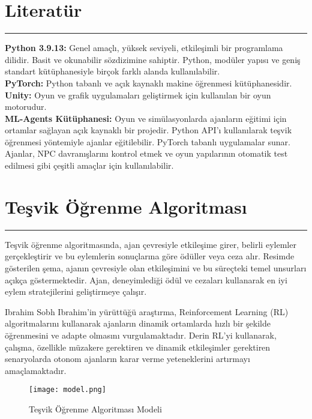 \documentclass{article}
\begin{document}
\section{Literatür}
\rule{\textwidth}{0.5pt}
\par \textbf{Python 3.9.13:} Genel amaçlı, yüksek seviyeli, etkileşimli bir programlama dilidir. Basit ve okunabilir sözdizimine sahiptir. Python, modüler yapısı ve geniş standart kütüphanesiyle birçok farklı alanda kullanılabilir.\\[5pt]

\textbf{PyTorch:} Python tabanlı ve açık kaynaklı makine öğrenmesi kütüphanesidir.\\[5pt]

\textbf{Unity:} Oyun ve grafik uygulamaları geliştirmek için kullanılan bir oyun motorudur.\\[5pt]

\textbf{ML-Agents Kütüphanesi:} Oyun ve simülasyonlarda ajanların eğitimi için ortamlar sağlayan açık kaynaklı bir projedir. Python API'ı kullanılarak teşvik öğrenmesi yöntemiyle ajanlar eğitilebilir. PyTorch tabanlı uygulamalar sunar. Ajanlar, NPC davranışlarını kontrol etmek ve oyun yapılarının otomatik test edilmesi gibi çeşitli amaçlar için kullanılabilir.


\section{Teşvik Öğrenme Algoritması}
\rule{\textwidth}{0.5pt}
\par Teşvik öğrenme algoritmasında, ajan çevresiyle etkileşime girer, belirli eylemler gerçekleştirir ve bu eylemlerin sonuçlarına göre ödüller veya ceza alır. Resimde gösterilen şema, ajanın çevresiyle olan etkileşimini ve bu süreçteki temel unsurları açıkça göstermektedir. Ajan, deneyimlediği ödül ve cezaları kullanarak en iyi eylem stratejilerini geliştirmeye çalışır.
\newline
\par Ibrahim Sobh Ibrahim'in yürüttüğü araştırma\cite{kiran2021deep}, Reinforcement Learning (RL) algoritmalarını kullanarak ajanların dinamik ortamlarda hızlı bir şekilde öğrenmesini ve adapte olmasını vurgulamaktadır. Derin RL'yi kullanarak, çalışma, özellikle müzakere gerektiren ve dinamik etkileşimler gerektiren senaryolarda otonom ajanların karar verme yeteneklerini artırmayı amaçlamaktadır.\\[5pt]

\begin{figure}[h]
    \begin{center}
        \texttt{[image: model.png]}
    \end{center}
      \caption{Teşvik Öğrenme Algoritması Modeli \cite{model}}
\end{figure}
\end{document}
